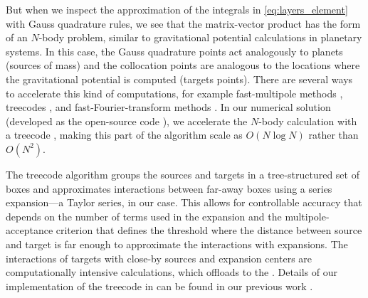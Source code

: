 But when we inspect the approximation of the integrals in  \eqref{eq:layers_element} with Gauss quadrature rules, we see that the matrix-vector product has the form of an $N$-body problem, similar to gravitational potential calculations in planetary systems. In this case, the Gauss quadrature points act analogously to planets (sources of mass) and the collocation points are analogous to the locations where the gravitational potential is computed (targets points). There are several ways to accelerate this kind of computations, for example fast-multipole methods \cite{GreengardRokhlin1987}, treecodes \cite{BarnesHut1986}, and fast-Fourier-transform methods \cite{PhillipsWhite1997}.
In our numerical solution (developed as the open-source code \pygbe), we accelerate the $N$-body calculation with a treecode \cite{BarnesHut1986,LiJohnstonKrasny2009}, making this part of the algorithm scale as $O(N\log N)$ rather than $O(N^2)$. 

The treecode algorithm groups the sources and targets in a tree-structured set of boxes and approximates interactions between far-away boxes using a series expansion---a Taylor series, in our case. This allows for controllable accuracy that depends on the number of terms used in the expansion and the multipole-acceptance criterion that defines the threshold where the distance between source and target is far enough to approximate the interactions with expansions. The interactions of targets with close-by sources and expansion centers are computationally intensive calculations, which \pygbe offloads to the \gpu. Details of our implementation of the treecode in \pygbe can be found in our previous work \cite{CooperBarba-share154331}.
